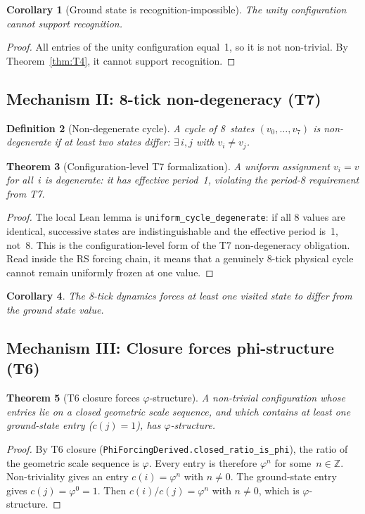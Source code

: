 \documentclass[11pt,a4paper]{article}
\newcommand{\phirs}{\varphi}
\newtheorem{theorem}{Theorem}[section]
\newtheorem{corollary}[theorem]{Corollary}
\newtheorem{definition}[theorem]{Definition}
\begin{document}
\begin{corollary}[Ground state is recognition-impossible]
\label{cor:gs_impossible}
The unity configuration cannot support recognition.
\end{corollary}
\begin{proof}
All entries of the unity configuration equal~1, so it is not non-trivial.  By Theorem~\ref{thm:T4}, it cannot support recognition.
\end{proof}

\subsection{Mechanism II: 8-tick non-degeneracy (T7)}

\begin{definition}[Non-degenerate cycle]
A cycle of 8~states $(v_0,\ldots,v_7)$ is \emph{non-degenerate} if at least two states differ: $\exists\,i,j$ with $v_i\neq v_j$.
\end{definition}

\begin{theorem}[Configuration-level T7 formalization]
\label{thm:T7}
A uniform assignment $v_i=v$ for all~$i$ is degenerate: it has effective period~1, violating the period-8 requirement from T7.
\end{theorem}
\begin{proof}
The local Lean lemma is \texttt{uniform\_cycle\_degenerate}: if all 8 values are identical, successive states are indistinguishable and the effective period is~1, not~8.  This is the configuration-level form of the T7 non-degeneracy obligation.  Read inside the RS forcing chain, it means that a genuinely 8-tick physical cycle cannot remain uniformly frozen at one value.
\end{proof}

\begin{corollary}
The 8-tick dynamics forces at least one visited state to differ from the ground state value.
\end{corollary}

\subsection{Mechanism III: Closure forces phi-structure (T6)}

\begin{theorem}[T6 closure forces $\phirs$-structure]
\label{thm:T6}
A non-trivial configuration whose entries lie on a closed geometric scale sequence, and which contains at least one ground-state entry ($c(j)=1$), has $\phirs$-structure.
\end{theorem}
\begin{proof}
By T6 closure (\texttt{PhiForcingDerived.closed\_ratio\_is\_phi}), the ratio of the geometric scale sequence is $\phirs$.  Every entry is therefore $\phirs^n$ for some~$n\in\mathbb Z$.  Non-triviality gives an entry $c(i)=\phirs^n$ with $n\neq 0$.  The ground-state entry gives $c(j)=\phirs^0=1$.  Then $c(i)/c(j)=\phirs^n$ with $n\neq 0$, which is $\phirs$-structure.
\end{proof}
\end{document}
